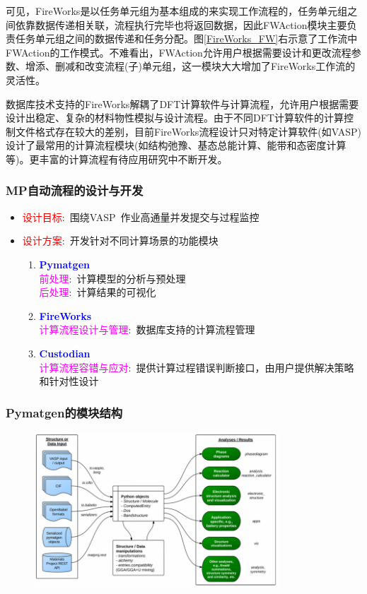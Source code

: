 {可见，\textrm{FireWorks}是以任务单元组为基本组成的来实现工作流程的，任务单元组之间依靠数据传递相关联，流程执行完毕也将返回数据，因此\textrm{FWAction}模块主要负责任务单元组之间的数据传递和任务分配。图\ref{FireWorks_FW}右示意了工作流中\textrm{FWAction}的工作模式。不难看出，\textrm{FWAction}允许用户根据需要设计和更改流程参数、增添、删减和改变流程(子)单元组，这一模块大大增加了\textrm{FireWorks}工作流的灵活性。

数据库技术支持的\textrm{FireWorks}解耦了\textrm{DFT}计算软件与计算流程，允许用户根据需要设计出稳定、复杂的材料物性模拟与设计流程。由于不同\textrm{DFT}计算软件的计算控制文件格式存在较大的差别，目前\textrm{FireWorks}流程设计只对特定计算软件(如\textrm{VASP})设计了最常用的计算流程模块(如结构弛豫、基态总能计算、能带和态密度计算等)。更丰富的计算流程有待应用研究中不断开发。
}

\frame
{
	\frametitle{\textrm{MP}自动流程的设计与开发}
	\begin{itemize}
		\item \textcolor{red}{设计目标}:~围绕\textrm{VASP~}作业高通量并发提交与过程监控
		\item \textcolor{red}{设计方案}:~开发针对不同计算场景的功能模块
			\begin{enumerate}
    \setlength{\itemsep}{15pt}
				\item \textcolor{blue}{\textbf{Pymatgen}}\\
					\textcolor{magenta}{前处理}:~计算模型的分析与预处理\\
					\textcolor{magenta}{后处理}:~计算结果的可视化
				\item \textcolor{blue}{\textbf{FireWorks}}\\
\textcolor{magenta}{计算流程设计与管理}:~数据库支持的计算流程管理
				\item \textcolor{blue}{\textbf{Custodian}}\\
\textcolor{magenta}{计算流程容错与应对}:~提供计算过程错误判断接口，由用户提供解决策略和针对性设计
			\end{enumerate}
	\end{itemize}
}

\frame
{
	\frametitle{\textrm{Pymatgen}的模块结构}
\begin{figure}[h!]
\centering
\vspace*{-0.1in}
\includegraphics[height=2.3in]{Figures/MP_library.png}
\caption{\fontsize{7.2pt}{4.2pt}}%
\label{Pymatgen_Lib}
\end{figure} 
}

